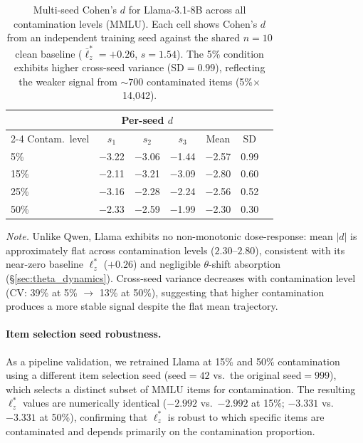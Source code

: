 \begin{table}[h]
\centering
\caption{Multi-seed Cohen's $d$ for Llama-3.1-8B across all contamination levels (MMLU). Each cell shows Cohen's $d$ from an independent training seed against the shared $n{=}10$ clean baseline ($\bar{\ell}_z^* = {+}0.26$, $s = 1.54$). The 5\% condition exhibits higher cross-seed variance (SD${=}0.99$), reflecting the weaker signal from ${\sim}700$ contaminated items (5\%$\times$14{,}042).}
\label{tab:llama_multiseed}
\footnotesize
\begin{tabular}{@{}lcccccc@{}}
\toprule
& \multicolumn{3}{c}{Per-seed $d$} & & \\
\cmidrule(lr){2-4}
Contam.\ level & $s_1$ & $s_2$ & $s_3$ & Mean & SD \\
\midrule
5\%  & $-$3.22 & $-$3.06 & $-$1.44 & $-$2.57 & 0.99 \\
15\% & $-$2.11 & $-$3.21 & $-$3.09 & $-$2.80 & 0.60 \\
25\% & $-$3.16 & $-$2.28 & $-$2.24 & $-$2.56 & 0.52 \\
50\% & $-$2.33 & $-$2.59 & $-$1.99 & $-$2.30 & 0.30 \\
\bottomrule
\end{tabular}
\vspace{0.5em}

\noindent\textit{Note.} Unlike Qwen, Llama exhibits no non-monotonic dose-response: mean $|d|$ is approximately flat across contamination levels ($2.30$--$2.80$), consistent with its near-zero baseline $\ell_z^*$ ($+0.26$) and negligible $\theta$-shift absorption (\S\ref{sec:theta_dynamics}). Cross-seed variance decreases with contamination level (CV: 39\% at 5\% $\to$ 13\% at 50\%), suggesting that higher contamination produces a more stable signal despite the flat mean trajectory.
\end{table}

\paragraph{Item selection seed robustness.}
As a pipeline validation, we retrained Llama at 15\% and 50\% contamination using a different item selection seed (seed${=}42$ vs.\ the original seed${=}999$), which selects a distinct subset of MMLU items for contamination.
The resulting $\ell_z^*$ values are numerically identical ($-2.992$ vs.\ $-2.992$ at 15\%; $-3.331$ vs.\ $-3.331$ at 50\%), confirming that $\ell_z^*$ is robust to which specific items are contaminated and depends primarily on the contamination proportion.

